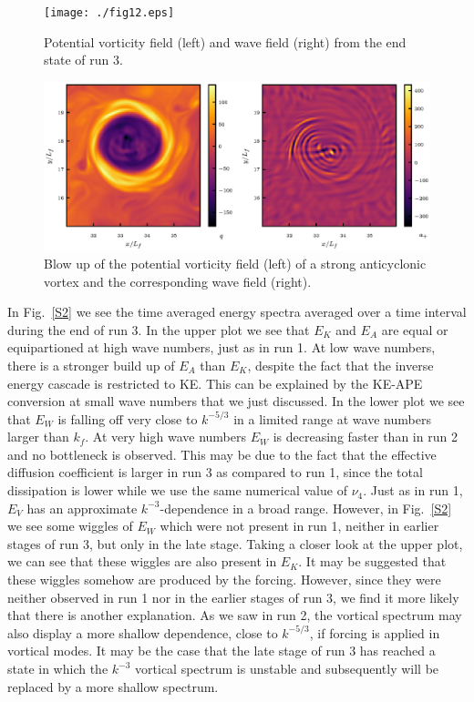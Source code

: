  \begin{figure}[h]
 \centerline{\texttt{[image: ./fig12.eps]}}
\caption{Potential vorticity field (left) and wave field (right) from the end state of run 3.}
 \label{Vis2}
 \end{figure}
 
\begin{figure}[h]
\centerline{\includegraphics[angle=0]{./fig13.eps}}
\caption{Blow up of the potential vorticity field (left) of a strong anticyclonic vortex and the corresponding wave field (right). }
\label{Vis3}
\end{figure}


 
 
In Fig.~\ref{S2} we see the time averaged energy spectra averaged over a time
interval during the end of run 3.  In the upper plot we see that $ E_K $ and $ E_A $ {
are equal or equipartioned} at high wave numbers, just as in run 1. At low wave
numbers, there is a stronger build up of $ E_A $ than $ E_K $, despite the fact that
the inverse energy cascade is restricted to KE. This can be explained by the KE-APE
conversion at small wave numbers that we just discussed.  In the lower plot we see that
$ E_W $ is falling off very close to $ k^{-5/3} $ in a limited range at wave numbers
larger than $ k_f $. At very high wave numbers  $ E_W $  is decreasing faster than in
run 2 and no bottleneck is observed. This may be due to the fact that the effective
diffusion coefficient is larger in run 3 as compared to run 1, since the total
dissipation is lower while we use the same numerical value of $ \nu_4 $.  Just as in
run 1, $ E_{V} $ has an approximate $ k^{-3} $-dependence in a broad range. However,
in Fig.~\ref{S2} we see some wiggles of $ E_W $ which were not present in run 1,
neither  in earlier stages of run 3, but only in the late stage. Taking a closer look
at the upper plot, we can see that these wiggles are also present in $ E_K $. It may be
suggested that these wiggles somehow are produced by the forcing. However, since they
were neither observed in run 1 nor in the earlier stages of run 3, we find it more
likely that there is another explanation. { As we saw in run 2, the vortical spectrum
may also display a more shallow dependence, close to $ k^{-5/3} $, if forcing is
applied in vortical modes. It may be the case that the late stage of run 3 has reached
a state in which the $ k^{-3} $ vortical spectrum is unstable and subsequently will be
replaced by a more shallow spectrum. }
 
